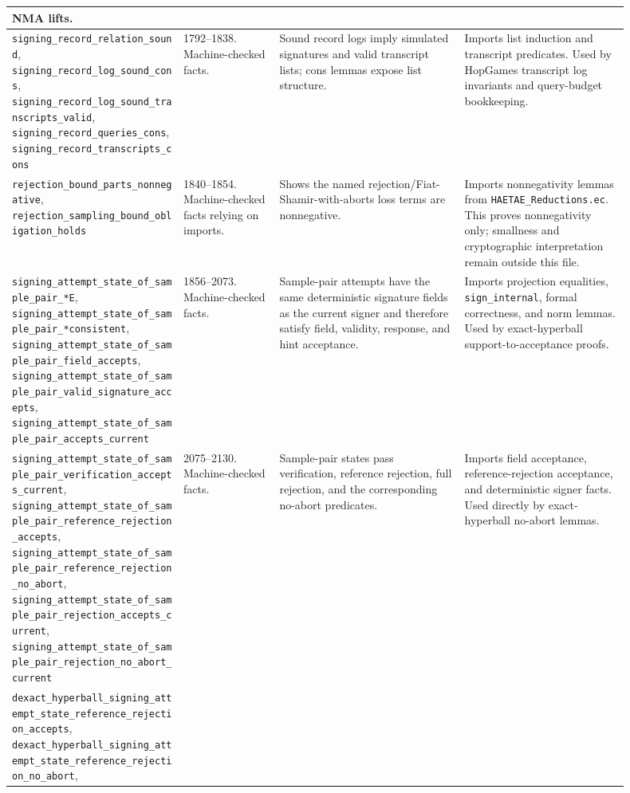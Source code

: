 \documentclass[11pt]{report}
\DeclareRobustCommand{\file}[1]{\ifmmode\text{\nolinkurl{#1}}\else\nolinkurl{#1}\fi}
\DeclareRobustCommand{\ec}[1]{\ifmmode\text{\nolinkurl{#1}}\else\nolinkurl{#1}\fi}
\theoremstyle{definition}
\theoremstyle{plain}
\begin{document}
{\begin{longtable}{p{0.25\linewidth}p{0.14\linewidth}p{0.27\linewidth}p{0.24\linewidth}}
NMA lifts. \\
\midrule
\ec{signing\_record\_relation\_sound},
\ec{signing\_record\_log\_sound\_cons},
\ec{signing\_record\_log\_sound\_transcripts\_valid},
\ec{signing\_record\_queries\_cons},
\ec{signing\_record\_transcripts\_cons} &
1792--1838. Machine-checked facts. &
Sound record logs imply simulated signatures and valid transcript lists; cons
lemmas expose list structure. &
Imports list induction and transcript predicates.  Used by HopGames transcript
log invariants and query-budget bookkeeping. \\
\midrule
\ec{rejection\_bound\_parts\_nonnegative},
\ec{rejection\_sampling\_bound\_obligation\_holds} &
1840--1854. Machine-checked facts relying on imports. &
Shows the named rejection/Fiat-Shamir-with-aborts loss terms are nonnegative. &
Imports nonnegativity lemmas from \file{HAETAE\_Reductions.ec}.  This proves
nonnegativity only; smallness and cryptographic interpretation remain outside
this file. \\
\midrule
\ec{signing\_attempt\_state\_of\_sample\_pair\_*E},
\ec{signing\_attempt\_state\_of\_sample\_pair\_*consistent},
\ec{signing\_attempt\_state\_of\_sample\_pair\_field\_accepts},
\ec{signing\_attempt\_state\_of\_sample\_pair\_valid\_signature\_accepts},
\ec{signing\_attempt\_state\_of\_sample\_pair\_accepts\_current} &
1856--2073. Machine-checked facts. &
Sample-pair attempts have the same deterministic signature fields as the
current signer and therefore satisfy field, validity, response, and hint
acceptance. &
Imports projection equalities, \ec{sign\_internal}, formal correctness, and
norm lemmas.  Used by exact-hyperball support-to-acceptance proofs. \\
\midrule
\ec{signing\_attempt\_state\_of\_sample\_pair\_verification\_accepts\_current},
\ec{signing\_attempt\_state\_of\_sample\_pair\_reference\_rejection\_accepts},
\ec{signing\_attempt\_state\_of\_sample\_pair\_reference\_rejection\_no\_abort},
\ec{signing\_attempt\_state\_of\_sample\_pair\_rejection\_accepts\_current},
\ec{signing\_attempt\_state\_of\_sample\_pair\_rejection\_no\_abort\_current} &
2075--2130. Machine-checked facts. &
Sample-pair states pass verification, reference rejection, full rejection, and
the corresponding no-abort predicates. &
Imports field acceptance, reference-rejection acceptance, and deterministic
signer facts.  Used directly by exact-hyperball no-abort lemmas. \\
\midrule
\ec{dexact\_hyperball\_signing\_attempt\_state\_reference\_rejection\_accepts},
\ec{dexact\_hyperball\_signing\_attempt\_state\_reference\_rejection\_no\_abort},

\end{longtable}}
\end{document}

